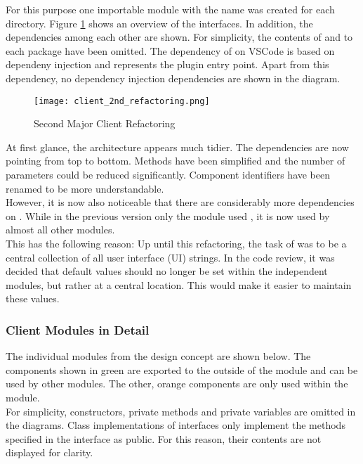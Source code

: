 For this purpose one importable module with the name  was created for each directory.
Figure \ref{fig:client_2nd_refactoring} shows an overview of the interfaces.
In addition, the dependencies among each other are shown.
For simplicity, the contents of  and  to each package have been omitted.
The dependency of  on VSCode is based on dependeny injection and represents the plugin entry point.
Apart from this dependency, no dependency injection dependencies are shown in the diagram. \\

\begin{figure}[H]
    \centering
    \texttt{[image: client\_2nd\_refactoring.png]}
    \caption{Second Major Client Refactoring}
    \label{fig:client_2nd_refactoring}
\end{figure}

At first glance, the architecture appears much tidier.
The dependencies are now pointing from top to bottom.
Methods have been simplified and the number of parameters could be reduced significantly.
Component identifiers have been renamed to be more understandable. \\

However, it is now also noticeable that there are considerably more dependencies on .
While in the previous version only the module  used , it is now used by almost all other modules.\\

This has the following reason: Up until this refactoring, the task of  was to be a central collection of all user interface (UI) strings. 
In the code review, it was decided that default values should no longer be set within the independent modules,
but rather at a central location.
This would make it easier to maintain these values.

\subsubsection{Client Modules in Detail}
The individual modules from the design concept are shown below.
The components shown in green are exported to the outside of the module and can be used by other modules.
The other, orange components are only used within the module. \\

For simplicity, constructors, private methods and private variables are omitted in the diagrams.
Class implementations of interfaces only implement the methods specified in the interface as public.
For this reason, their contents are not displayed for clarity. \\

